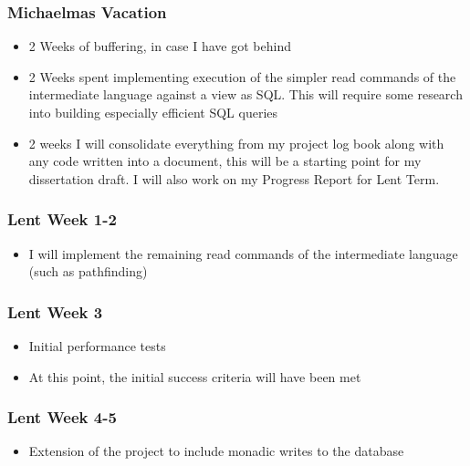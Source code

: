 \documentclass[12pt,a4paper,twoside,openright]{report}
\providecommand{\tightlist}{%
  \setlength{\itemsep}{0pt}\setlength{\parskip}{0pt}}
\begin{document}
\hypertarget{michaelmas-vacation}{%
\subsubsection{Michaelmas Vacation}\label{michaelmas-vacation}}

\begin{itemize}
\tightlist
\item
  2 Weeks of buffering, in case I have got behind
\item
  2 Weeks spent implementing execution of the simpler read commands of
  the intermediate language against a view as SQL. This will require
  some research into building especially efficient SQL queries
\item
  2 weeks I will consolidate everything from my project log book along
  with any code written into a document, this will be a starting point
  for my dissertation draft. I will also work on my Progress Report for
  Lent Term.
\end{itemize}

\hypertarget{lent-week-1-2}{%
\subsubsection{Lent Week 1-2}\label{lent-week-1-2}}

\begin{itemize}
\tightlist
\item
  I will implement the remaining read commands of the intermediate
  language (such as pathfinding)
\end{itemize}

\hypertarget{lent-week-3}{%
\subsubsection{Lent Week 3}\label{lent-week-3}}

\begin{itemize}
\tightlist
\item
  Initial performance tests
\item
  At this point, the initial success criteria will have been met
\end{itemize}

\hypertarget{lent-week-4-5}{%
\subsubsection{Lent Week 4-5}\label{lent-week-4-5}}

\begin{itemize}
\tightlist
\item
  Extension of the project to include monadic writes to the database
\end{itemize}
\end{document}
